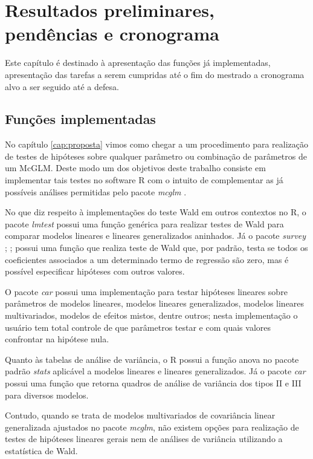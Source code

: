 
\chapter{Resultados preliminares, pendências e cronograma}

Este capítulo é destinado à apresentação das funções já implementadas, apresentação das tarefas a serem cumpridas até o fim do mestrado a cronograma alvo a ser seguido até a defesa.

\label{cap:result}

\section{Funções implementadas}

No capítulo \autoref{cap:proposta} vimos como chegar a um procedimento para realização de testes de hipóteses sobre qualquer parâmetro ou combinação de parâmetros de um McGLM. Deste modo um dos objetivos deste trabalho consiste em implementar tais testes no software R \citep{softwareR} com o intuito de complementar as já possíveis análises permitidas pelo pacote \emph{mcglm} \citep{mcglm}.

No que diz respeito à implementações do teste Wald em outros contextos no R, o pacote \emph{lmtest} \citep{lmtest} possui uma função genérica para realizar testes de Wald para comparar modelos lineares e lineares generalizados aninhados. Já o pacote \emph{survey} \citep{survey1}; \citep{survey2};\citep{survey3} possui uma função que realiza teste de Wald que, por padrão, testa se todos os coeficientes associados a um determinado termo de regressão são zero, mas é possível especificar hipóteses com outros valores. 

O pacote \emph{car} \citep{car} possui uma implementação para testar hipóteses lineares sobre parâmetros de modelos lineares, modelos lineares generalizados, modelos lineares multivariados, modelos de efeitos mistos, dentre outros; nesta implementação o usuário tem total controle de que parâmetros testar e com quais valores confrontar na hipótese nula. 

Quanto às tabelas de análise de variância, o R possui a função anova no pacote padrão \emph{stats} \citep{softwareR} aplicável a modelos lineares e lineares generalizados. Já o pacote \emph{car} \citep{car} possui uma função que retorna quadros de análise de variância dos tipos II e III para diversos modelos. 

Contudo, quando se trata de modelos multivariados de covariância linear generalizada ajustados no pacote \emph{mcglm}, não existem opções para realização de testes de hipóteses lineares gerais nem de análises de variância utilizando a estatística de Wald. 


